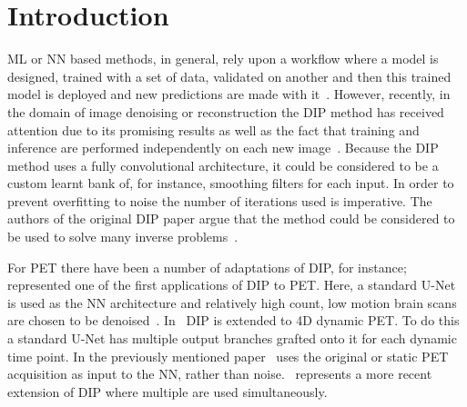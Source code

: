 \section{Introduction} \label{sec:introduction}
     \gls{ML} or \gls{NN} based methods, in general, rely upon a workflow where a model is designed, trained with a set of data, validated on another and then this trained model is deployed and new predictions are made with it~\cite{Krose2011AnNetworks}. 
    However, recently, in the domain of image denoising or reconstruction the \gls{DIP} method has  received attention due to its promising results as well as the fact that training and inference are performed independently on each new image~\cite{Ulyanov2018DeepPrior}. Because the \gls{DIP} method uses a fully convolutional architecture, it could be considered to be a custom learnt bank of, for instance, smoothing filters for each input. In order to prevent overfitting to noise the number of iterations used is imperative. The authors of the original \gls{DIP} paper argue that the method could be considered to be used to solve many inverse problems~\cite{Ulyanov2018DeepPrior}.
    
    For \gls{PET} there have been a number of adaptations of \gls{DIP}, for instance;~\cite{Gong2019PETPrior} represented one of the first applications of \gls{DIP} to \gls{PET}. Here, a standard U-Net is used as the \gls{NN} architecture and relatively high count, low motion brain scans are chosen to be denoised~\cite{Weng2015U-Net:Segmentation}. In~\cite{Hashimoto20214DNetwork} \gls{DIP} is extended to \gls{4D} dynamic \gls{PET}. To do this a standard U-Net has multiple output branches grafted onto it for each dynamic time point. In the previously mentioned paper~\cite{Hashimoto2019DynamicDatasets} uses the original or static \gls{PET} acquisition as input to the \gls{NN}, rather than noise.~\cite{Yang2022SimultaneousPrior} represents a more recent extension of \gls{DIP} where multiple  are used simultaneously.
    
